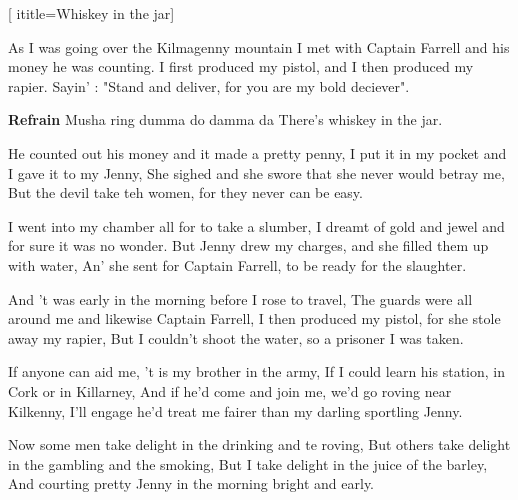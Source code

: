  [
ititle={Whiskey in the jar}]

\beginverse
As I was going over the Kilmagenny mountain
I met with Captain Farrell and his money he was counting.
I first produced my pistol, and I then produced my rapier.
Sayin' : "Stand and deliver, for you are my bold deciever".
\endverse

\beginchorus
\textbf{Refrain}
Musha ring dumma do damma da
There's whiskey in the jar.
\endchorus

\beginverse
He counted out his money and it made a pretty penny,
I put it in my pocket and I gave it to my Jenny,
She sighed and she swore that she never would betray me,
But the devil take teh women, for they never can be easy.
\endverse

\beginverse
I went into my chamber all for to take a slumber,
I dreamt of gold and jewel and for sure it was no wonder.
But Jenny drew my charges, and she filled them up with water,
An' she sent for Captain Farrell, to be ready for the slaughter.
\endverse

\beginverse
And 't was early in the morning before I rose to travel,
The guards were all around me and likewise Captain Farrell,
I then produced my pistol, for she stole away my rapier,
But I couldn't shoot the water, so a prisoner I was taken.
\endverse

\beginverse
If anyone can aid me, 't is my brother in the army,
If I could learn his station, in Cork or in Killarney,
And if he'd come and join me, we'd go roving near Kilkenny,
I'll engage he'd treat me fairer than my darling sportling Jenny.
\endverse

\beginverse
Now some men take delight in the drinking and te roving,
But others take delight in the gambling and the smoking,
But I take delight in the juice of the barley,
And courting pretty Jenny in the morning bright and early.
\endverse
\endsong